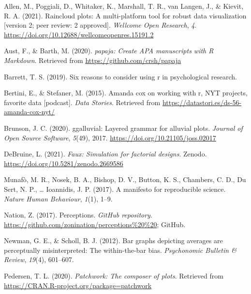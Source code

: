 \documentclass[
  english,
  doc,floatsintext]{apa6}
\newlength{\cslhangindent}
\newenvironment{CSLReferences}[2] %
 {%
  \setlength{\parindent}{0pt}
  \ifodd #1 \everypar{\setlength{\hangindent}{\cslhangindent}}\ignorespaces\fi
  \ifnum #2 > 0
  \setlength{\parskip}{#2\baselineskip}
  \fi
 }%
 {}
\begin{document}
\hypertarget{refs}{}
\begin{CSLReferences}{1}{0}
\leavevmode{}%
Allen, M., Poggiali, D., Whitaker, K., Marshall, T. R., van Langen, J., \& Kievit, R. A. (2021). Raincloud plots: A multi-platform tool for robust data visualization {[}version 2; peer review: 2 approved{]}. \emph{Wellcome Open Research}, \emph{4}. \url{https://doi.org/10.12688/wellcomeopenres.15191.2}

\leavevmode{}%
Aust, F., \& Barth, M. (2020). \emph{{papaja}: {Create} {APA} manuscripts with {R Markdown}}. Retrieved from \url{https://github.com/crsh/papaja}

\leavevmode{}%
Barrett, T. S. (2019). Six reasons to consider using r in psychological research.

\leavevmode{}%
Bertini, E., \& Stefaner, M. (2015). Amanda cox on working with r, NYT projects, favorite data {[}podcast{]}. \emph{Data Stories}. Retrieved from \url{https://datastori.es/ds-56-amanda-cox-nyt/}

\leavevmode{}%
Brunson, J. C. (2020). {ggalluvial}: Layered grammar for alluvial plots. \emph{Journal of Open Source Software}, \emph{5}(49), 2017. \url{https://doi.org/10.21105/joss.02017}

\leavevmode{}%
DeBruine, L. (2021). \emph{Faux: Simulation for factorial designs}. Zenodo. \url{https://doi.org/10.5281/zenodo.2669586}

\leavevmode{}%
Munafò, M. R., Nosek, B. A., Bishop, D. V., Button, K. S., Chambers, C. D., Du Sert, N. P., \ldots{} Ioannidis, J. P. (2017). A manifesto for reproducible science. \emph{Nature Human Behaviour}, \emph{1}(1), 1--9.

\leavevmode{}%
Nation, Z. (2017). Perceptions. \emph{GitHub repository}. \url{https://github.com/zonination/perceptions\%20\%20}; GitHub.

\leavevmode{}%
Newman, G. E., \& Scholl, B. J. (2012). Bar graphs depicting averages are perceptually misinterpreted: The within-the-bar bias. \emph{Psychonomic Bulletin \& Review}, \emph{19}(4), 601--607.

\leavevmode{}%
Pedersen, T. L. (2020). \emph{Patchwork: The composer of plots}. Retrieved from \url{https://CRAN.R-project.org/package=patchwork}


\end{CSLReferences}
\end{document}
